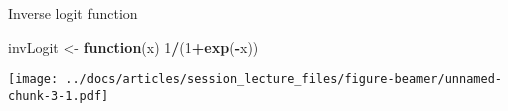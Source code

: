 \documentclass[
  ignorenonframetext,
]{beamer}
\newenvironment{Shaded}{\begin{snugshade}}{\end{snugshade}}
\newcommand{\ControlFlowTok}[1]{\textcolor[rgb]{0.13,0.29,0.53}{\textbf{#1}}}
\newcommand{\DecValTok}[1]{\textcolor[rgb]{0.00,0.00,0.81}{#1}}
\newcommand{\KeywordTok}[1]{\textcolor[rgb]{0.13,0.29,0.53}{\textbf{#1}}}
\newcommand{\NormalTok}[1]{#1}
\newcommand{\OperatorTok}[1]{\textcolor[rgb]{0.81,0.36,0.00}{\textbf{#1}}}
\newcommand{\StringTok}[1]{\textcolor[rgb]{0.31,0.60,0.02}{#1}}
\begin{document}
\begin{frame}[fragile]{Inverse logit function}
\protect\hypertarget{inverse-logit-function}{}

\begin{Shaded}
\begin{Highlighting}[]
\NormalTok{invLogit <-}\StringTok{ }\ControlFlowTok{function}\NormalTok{(x) }\DecValTok{1}\OperatorTok{/}\NormalTok{(}\DecValTok{1}\OperatorTok{+}\KeywordTok{exp}\NormalTok{(}\OperatorTok{-}\NormalTok{x))}
\end{Highlighting}
\end{Shaded}

\texttt{[image: ../docs/articles/session\_lecture\_files/figure-beamer/unnamed-chunk-3-1.pdf]}

\end{frame}
\end{document}

